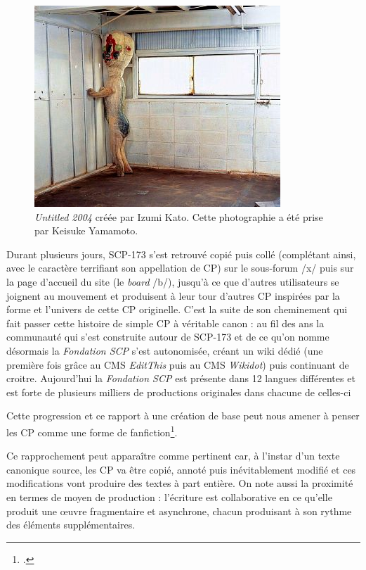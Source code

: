 \documentclass[12pt,a4paper,oneside,titlepage]{book} %
\begin{document}
		\begin{figure}
		\centering
		\includegraphics[scale=0.5]{illustration/SCP_173.jpg}
		
		\caption{\small \emph{Untitled 2004} créée par Izumi Kato. Cette photographie a été prise par Keisuke Yamamoto.}
		\label{img:scp_173}
	\end{figure}
	
	Durant plusieurs jours, SCP-173 s'est retrouvé copié puis collé (complétant ainsi, avec le caractère terrifiant son appellation de CP) sur le sous-forum /x/ puis sur la page d'accueil du site (le \textit{board} /b/), jusqu'à ce que d'autres utilisateurs se joignent au mouvement et produisent à leur tour d'autres CP inspirées par la forme et l'univers de cette CP originelle.
	C'est la suite de son cheminement qui fait passer cette histoire de simple CP à véritable canon : au fil des ans la communauté qui s'est construite autour de SCP-173 et de ce qu'on nomme désormais la \emph{Fondation SCP} s'est autonomisée, créant un wiki dédié (une première fois grâce au CMS \emph{EditThis} puis au CMS \emph{Wikidot}) puis continuant de croitre. Aujourd’hui la \emph{Fondation SCP} est présente dans 12 langues différentes et est forte de plusieurs milliers de productions originales dans chacune de celles-ci 
	
	Cette progression et ce rapport à une création de base peut nous amener à penser les CP comme une forme de fanfiction\footcite[voir p. 2]{goudet_agentivite_2021}.
	
	Ce rapprochement peut apparaître comme pertinent car, à l'instar d'un texte canonique source, les CP va être copié, annoté puis inévitablement modifié et ces modifications vont produire des textes à part entière. On note aussi la proximité en termes de moyen de production : l'écriture est collaborative en ce qu'elle produit une œuvre fragmentaire et asynchrone, chacun produisant à son rythme des éléments supplémentaires.
	
\end{document}
